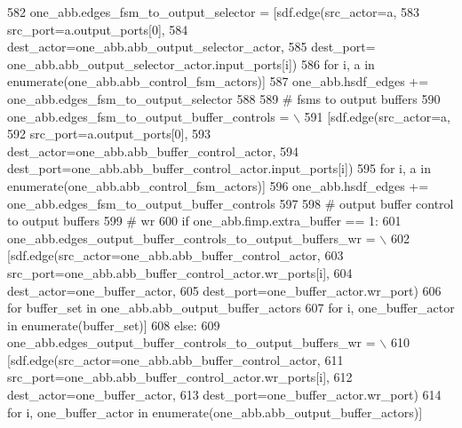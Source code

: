 \begin{DoxyCode}
582         one\_abb.edges\_fsm\_to\_output\_selector = [sdf.edge(src\_actor=a,
583                                                          src\_port=a.output\_ports[0],
584                                                          dest\_actor=one\_abb.abb\_output\_selector\_actor,
585                                                          dest\_port=
      one\_abb.abb\_output\_selector\_actor.input\_ports[i])
586                                                 \textcolor{keywordflow}{for} i, a \textcolor{keywordflow}{in} enumerate(one\_abb.abb\_control\_fsm\_actors)]
587         one\_abb.hsdf\_edges += one\_abb.edges\_fsm\_to\_output\_selector
588 
589         \textcolor{comment}{# fsms to output buffers}
590         one\_abb.edges\_fsm\_to\_output\_buffer\_controls = \(\backslash\)
591             [sdf.edge(src\_actor=a,
592                       src\_port=a.output\_ports[0],
593                       dest\_actor=one\_abb.abb\_buffer\_control\_actor,
594                       dest\_port=one\_abb.abb\_buffer\_control\_actor.input\_ports[i])
595              \textcolor{keywordflow}{for} i, a \textcolor{keywordflow}{in} enumerate(one\_abb.abb\_control\_fsm\_actors)]
596         one\_abb.hsdf\_edges += one\_abb.edges\_fsm\_to\_output\_buffer\_controls
597 
598         \textcolor{comment}{# output buffer control to output buffers}
599         \textcolor{comment}{# wr}
600         \textcolor{keywordflow}{if} one\_abb.fimp.extra\_buffer == 1:
601             one\_abb.edges\_output\_buffer\_controls\_to\_output\_buffers\_wr = \(\backslash\)
602                 [sdf.edge(src\_actor=one\_abb.abb\_buffer\_control\_actor,
603                           src\_port=one\_abb.abb\_buffer\_control\_actor.wr\_ports[i],
604                           dest\_actor=one\_buffer\_actor,
605                           dest\_port=one\_buffer\_actor.wr\_port)
606                  \textcolor{keywordflow}{for} buffer\_set \textcolor{keywordflow}{in} one\_abb.abb\_output\_buffer\_actors
607                  \textcolor{keywordflow}{for} i, one\_buffer\_actor \textcolor{keywordflow}{in} enumerate(buffer\_set)]
608         \textcolor{keywordflow}{else}:
609             one\_abb.edges\_output\_buffer\_controls\_to\_output\_buffers\_wr = \(\backslash\)
610                 [sdf.edge(src\_actor=one\_abb.abb\_buffer\_control\_actor,
611                           src\_port=one\_abb.abb\_buffer\_control\_actor.wr\_ports[i],
612                           dest\_actor=one\_buffer\_actor,
613                           dest\_port=one\_buffer\_actor.wr\_port)
614                  \textcolor{keywordflow}{for} i, one\_buffer\_actor \textcolor{keywordflow}{in} enumerate(one\_abb.abb\_output\_buffer\_actors)]

\end{DoxyCode}
